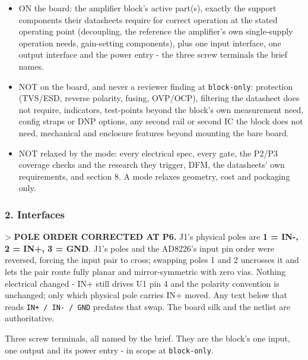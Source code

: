 \documentclass[11pt,a4paper]{article}
\begin{document}
\begin{itemize}
\item ON the board: the amplifier block's active part(s), exactly the support
components their datasheets require for correct operation at the stated
operating point (decoupling, the reference the amplifier's own single-supply
operation needs, gain-setting components), plus one input interface, one
output interface and the power entry - the three screw terminals the brief
names.
\item NOT on the board, and never a reviewer finding at \texttt{block-only}: protection
(TVS/ESD, reverse polarity, fusing, OVP/OCP), filtering the datasheet does not
require, indicators, test-points beyond the block's own measurement need,
config straps or DNP options, any second rail or second IC the block does not
need, mechanical and enclosure features beyond mounting the bare board.
\item NOT relaxed by the mode: every electrical spec, every gate, the P2/P3
coverage checks and the research they trigger, DFM, the datasheets' own
requirements, and section 8. A mode relaxes geometry, cost and packaging only.
\end{itemize}
\subsubsection*{2. Interfaces}
\textgreater{} \textbf{POLE ORDER CORRECTED AT P6.} J1's physical poles are \textbf{1 = IN-, 2 = IN+, 3 = GND}. J1's poles and the AD8226's input pin order were reversed, forcing the input pair to cross; swapping poles 1 and 2 uncrosses it and lets the pair route fully planar and mirror-symmetric with zero vias. Nothing electrical changed - IN+ still drives U1 pin 4 and the polarity convention is unchanged; only which physical pole carries IN+ moved. Any text below that reads \texttt{IN+ / IN- / GND} predates that swap. The board silk and the netlist are authoritative.

Three screw terminals, all named by the brief. They are the block's one input, one output and its power entry - in scope at \texttt{block-only}.
\end{document}
